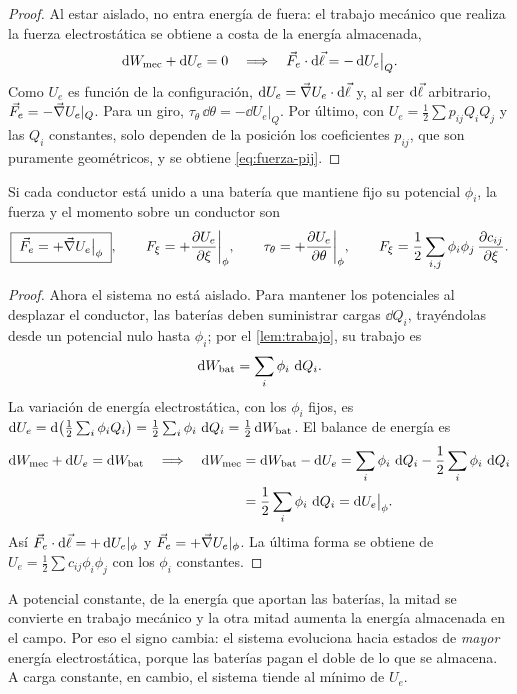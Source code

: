 \begin{proof}
Al estar aislado, no entra energía de fuera: el trabajo mecánico que realiza la fuerza electrostática se obtiene a costa de la energía
almacenada,
\[
  \mathop{}\!\mathrm{d}W_{\mathrm{mec}}+\mathop{}\!\mathrm{d} U_e=0\quad\Longrightarrow\quad \vec F_e\cdot\mathop{}\!\mathrm{d}\vec\ell=-\mathop{}\!\mathrm{d} U_e\big|_Q .
\]
Como $U_e$ es función de la configuración, $\mathop{}\!\mathrm{d} U_e=\vec\nabla U_e\cdot\mathop{}\!\mathrm{d}\vec\ell$ y, al ser $\mathop{}\!\mathrm{d}\vec\ell$ arbitrario, $\vec F_e=-\vec\nabla U_e|_Q$. Para un giro, $\tau_\theta\,\dd\theta=-\dd U_e|_Q$. Por
último, con $U_e=\frac12\sum p_{ij}Q_iQ_j$ y las $Q_i$ constantes, solo dependen de la posición los coeficientes $p_{ij}$, que son puramente geométricos, y se obtiene
\eqref{eq:fuerza-pij}.
\end{proof}

\begin{teorema}\label{teo:fuerza-phi}
Si cada conductor está unido a una batería que mantiene fijo su potencial $\phi_i$, la fuerza y el momento sobre un conductor son
\begin{equation}\label{eq:fuerza-phi}
  \boxed{\;\vec F_e=+\vec\nabla U_e\big|_{\phi}\;},\qquad F_\xi=+\frac{\partial U_e}{\partial\xi}\bigg|_{\phi},\qquad \tau_\theta=+\frac{\partial U_e}{\partial\theta}\bigg|_{\phi},
  \qquad F_\xi=\frac12\sum_{i,j}\phi_i\phi_j\,\frac{\partial c_{ij}}{\partial\xi}.
\end{equation}
\end{teorema}

\begin{proof}
Ahora el sistema no está aislado. Para mantener los potenciales al desplazar el conductor, las baterías deben suministrar cargas $\dd Q_i$, trayéndolas
desde un potencial nulo hasta $\phi_i$; por el \cref{lem:trabajo}, su trabajo es
\[
  \mathop{}\!\mathrm{d}W_{\mathrm{bat}}=\sum_i\phi_i\,\mathop{}\!\mathrm{d} Q_i .
\]
La variación de energía electrostática, con los $\phi_i$ fijos, es $\mathop{}\!\mathrm{d} U_e=\mathop{}\!\mathrm{d}\big(\frac12\sum_i\phi_iQ_i\big)=\frac12\sum_i\phi_i\,\mathop{}\!\mathrm{d} Q_i=\frac12\mathop{}\!\mathrm{d}W_{\mathrm{bat}}$. El balance de energía es
\[
  \begin{aligned}
  \dd\Wmec+\dd U_e=\dd\Wbat\quad\Longrightarrow\quad \dd\Wmec&=\dd\Wbat-\dd U_e=\sum_i\phi_i\,\dd Q_i-\frac12\sum_i\phi_i\,\dd Q_i\\
  &=\frac12\sum_i\phi_i\,\dd Q_i=\dd U_e\big|_\phi .
  \end{aligned}
\]
Así $\vec F_e\cdot\mathop{}\!\mathrm{d}\vec\ell=+\mathop{}\!\mathrm{d} U_e|_\phi$ y $\vec F_e=+\vec\nabla U_e|_\phi$. La última forma se obtiene de $U_e=\frac12\sum c_{ij}\phi_i\phi_j$ con los $\phi_i$ constantes.
\end{proof}

\begin{observacion}\label{obs:baterias}
A potencial constante, de la energía que aportan las baterías, la mitad se convierte en trabajo mecánico y la otra mitad aumenta la energía
almacenada en el campo. Por eso el signo cambia: el sistema evoluciona hacia estados de \emph{mayor} energía electrostática, porque las baterías
pagan el doble de lo que se almacena. A carga constante, en cambio, el sistema tiende al mínimo de $U_e$.
\end{observacion}


